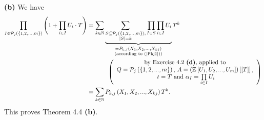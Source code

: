 \documentclass[numbers=enddot,12pt,final,onecolumn,notitlepage]{scrartcl}%
\begin{document}
\textbf{(b)} We have%
\begin{align*}
\prod_{I\in\mathcal{P}_{j}\left(  \left\{  1,2,...,m\right\}  \right)
}\left(  1+\prod_{i\in I}U_{i}\cdot T\right)   &  =\sum_{k\in\mathbb{N}%
}\underbrace{\sum_{\substack{S\subseteq\mathcal{P}_{j}\left(  \left\{
1,2,...,m\right\}  \right)  ;\\\left\vert S\right\vert =k}}\prod_{I\in S}%
\prod\limits_{i\in I}U_{i}}_{\substack{=P_{k,j}\left(  X_{1},X_{2}%
,...,X_{kj}\right)  \\\text{(according to (\ref{Pkj1}))}}}T^{k}\\
&  \ \ \ \ \ \ \ \ \ \ \left(
\begin{array}
[c]{c}%
\text{by Exercise 4.2 \textbf{(d)}, applied to}\\
Q=\mathcal{P}_{j}\left(  \left\{  1,2,...,m\right\}  \right)  \text{,
}A=\left(  \mathbb{Z}\left[  U_{1},U_{2},...,U_{m}\right]  \right)  \left[
\left[  T\right]  \right]  \text{,}\\
\text{ }t=T\text{ and }\alpha_{I}=\prod\limits_{i\in I}U_{i}%
\end{array}
\right) \\
&  =\sum_{k\in\mathbb{N}}P_{k,j}\left(  X_{1},X_{2},...,X_{kj}\right)  T^{k}.
\end{align*}
This proves Theorem 4.4 \textbf{(b)}.
\end{document}
